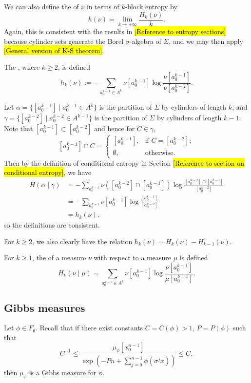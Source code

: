 We can also define the  of $\nu$ in terms of $k$-block entropy by
\[
	h(\nu) = \lim_{k \to +\infty}\frac{H_k(\nu)}{k}.
\]
Again, this is consistent with the results in \hl{[Reference to entropy sections]} because cylinder sets generate the Borel $\sigma$-algebra of $\Sigma$, and we may then apply \hl{[General version of K-S theorem]}.

\begin{definition}
	The , where $k \geq 2$, is defined
	\[
		h_k(\nu) := -\sum_{a_0^{k - 1} \in A^k}{\nu[a_0^{k - 1}] \log{\frac{\nu[a_0^{k - 1}]}{\nu[a_0^{k - 2}]}}}.
	\]
\end{definition}
Let $\alpha = \{[a_0^{k - 1}] \mid a_0^{k - 1} \in A^k\}$ is the partition of $\Sigma$ by cylinders of length $k$, and $\gamma = \{[a_0^{k - 2}] \mid a_0^{k - 2} \in A^{k - 1}\}$ is the partition of $\Sigma$ by cylinders of length $k - 1$. Note that $[a_0^{k - 1}] \subset [a_0^{k - 2}]$ and hence for $C \in \gamma$,
\[
	[a_0^{k - 1}] \cap C =
	\begin{cases}
		\left[a_0^{k - 1}\right],	& \text{if } C = [a_0^{k - 2}]; \\
		\emptyset,	& \text{otherwise}.
	\end{cases}
\]
Then by the definition of conditional entropy in Section \hl{[Reference to section on conditional entropy]}, we have
\begin{align*}
	H(\alpha \mid \gamma) &= -\sum_{a_0^{k - 1}}{\nu([a_0^{k - 2}] \cap [a_0^{k - 1}]) \log{\frac{[a_0^{k - 2}] \cap [a_0^{k - 1}]}{[a_0^{k - 2}]}}} \\
		&= -\sum_{a_0^{k - 1}}{\nu[a_0^{k - 1}] \log{\frac{[a_0^{k - 1}]}{[a_0^{k - 2}]}}} \\
		&= h_k(\nu),
\end{align*}
so the definitions are consistent.

For $k \geq 2$, we also clearly have the relation $h_k(\nu) = H_k(\nu) - H_{k - 1}(\nu)$.

\begin{definition}
	For $k \geq 1$, the  of a measure $\nu$ with respect to a measure $\mu$ is defined
	\[
		H_k(\nu \mid \mu) = \sum_{a_0^{k - 1} \in A^k}{\nu[a_0^{k - 1}] \log{\frac{\nu[a_0^{k - 1}]}{\mu[a_0^{k - 1}]}}}.
	\]
\end{definition}

\subsection{Gibbs measures}
Let $\phi \in F_\theta$. Recall that if there exist constants $C = C(\phi) > 1$, $P = P(\phi)$ such that
\[
	C^{-1} \leq \frac{\mu_\phi[x_0^{n - 1}]}{\exp\left(-Pn + \sum_{j = 0}^{n - 1}{\phi(\sigma^j x)}\right)} \leq C,
\]
then $\mu_\phi$ is a Gibbs measure for $\phi$.

